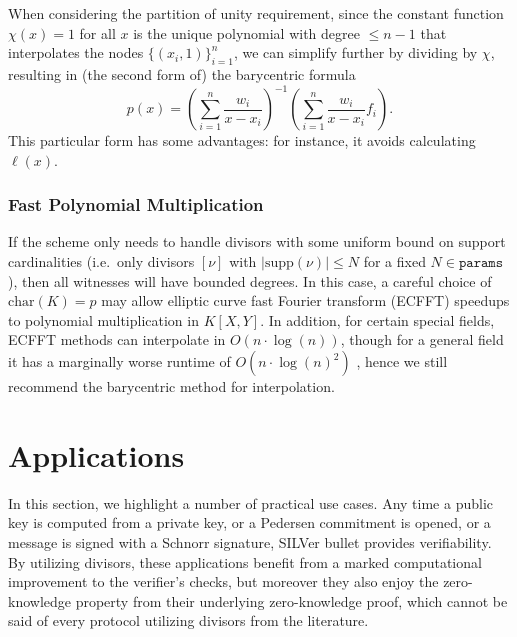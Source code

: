 \documentclass[11pt,letterpaper]{article}
\theoremstyle{definition}
\newcommand{\6}{\mathbf}
\newcommand{\7}{\mathcal}
\begin{document}
When considering the partition of unity requirement, since the constant function $\chi(x) = 1$ for all $x$ is the unique polynomial with degree $\leq n-1$ that interpolates the nodes $\{(x_i, 1)\}_{i=1}^n$, we can simplify further by dividing by $\chi$, resulting in (the second form of) the barycentric formula 
$$p(x) = \left( \sum_{i=1}^n \frac{w_i}{x-x_i} \right)^{-1} \left( \sum_{i=1}^n \frac{w_i}{x-x_i} f_i \right).$$
This particular form has some advantages: for instance, it avoids calculating $\ell(x)$.





\subsubsection{Fast Polynomial Multiplication}

If the scheme only needs to handle divisors with some uniform bound on support cardinalities (i.e.\ only divisors $[\nu]$ with $\left|\text{supp}(\nu)\right| \leq N$ for a fixed $N \in \texttt{params}$), then all witnesses will have bounded degrees. In this case, a careful choice of $\text{char}(K) = p$ may allow elliptic curve fast Fourier transform (ECFFT) speedups to polynomial multiplication in $K[X,Y]$.
In addition, for certain special fields, ECFFT methods can interpolate in $O(n \cdot \log(n))$, though for a general field it has a marginally worse runtime of $O(n \cdot \log(n)^2)$ \cite{Fabrizio}, hence we still recommend the barycentric method for interpolation.
















\section{Applications}


In this section, we highlight a number of practical use cases. Any time a public key is computed from a private key, or a Pedersen commitment is opened, or a message is signed with a Schnorr signature, SILVer bullet provides verifiability. By utilizing divisors, these applications benefit from a marked computational improvement to the verifier's checks, but moreover they also enjoy the zero-knowledge property from their underlying zero-knowledge proof, which cannot be said of every protocol utilizing divisors from the literature.
\end{document}

